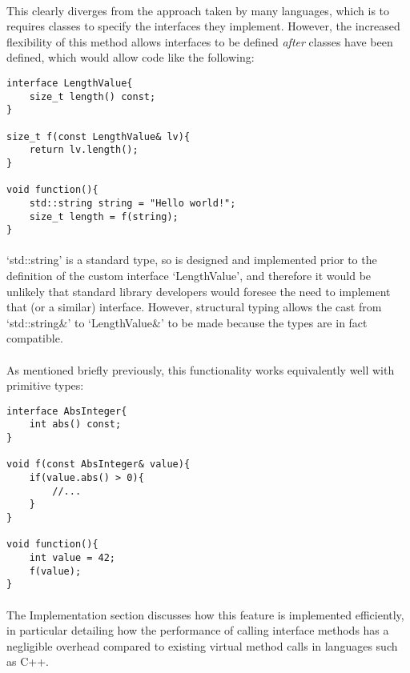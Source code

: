 \documentclass[12pt,twoside,notitlepage]{report}
\begin{document}
\paragraph{}
This clearly diverges from the approach taken by many languages, which is to requires classes to specify the interfaces they implement. However, the increased flexibility of this method allows interfaces to be defined \emph{after} classes have been defined, which would allow code like the following:


\begin{lstlisting}
interface LengthValue{
	size_t length() const;
}

size_t f(const LengthValue& lv){
	return lv.length();
}

void function(){
	std::string string = "Hello world!";
	size_t length = f(string);
}
\end{lstlisting}


\paragraph{}
`std::string' is a standard type, so is designed and implemented prior to the definition of the custom interface `LengthValue', and therefore it would be unlikely that standard library developers would foresee the need to implement that (or a similar) interface. However, structural typing allows the cast from `std::string\&' to `LengthValue\&' to be made because the types are in fact compatible.

\paragraph{}
As mentioned briefly previously, this functionality works equivalently well with primitive types:

\begin{lstlisting}
interface AbsInteger{
	int abs() const;
}

void f(const AbsInteger& value){
	if(value.abs() > 0){
		//...
	}
}

void function(){
	int value = 42;
	f(value);
}
\end{lstlisting}

\paragraph{}
The Implementation section discusses how this feature is implemented efficiently, in particular detailing how the performance of calling interface methods has a negligible overhead compared to existing virtual method calls in languages such as C++.
\end{document}
